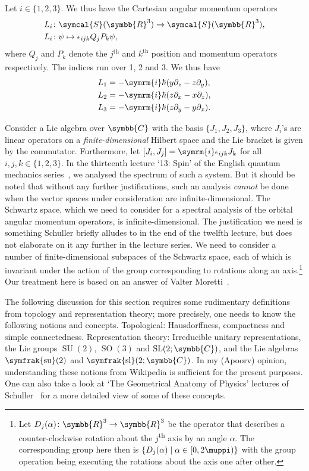 \documentclass[12pt, a4 paper]{article}
\theoremstyle{definition}
\newcommand{\position}{Q}
\newcommand{\momentum}{P}
\newcommand{\rthree}{\symbb{R}^3}
\newcommand{\rr}{\symbb{R}}
\newcommand{\cc}{\symbb{C}}
\newcommand{\schwartz}{\symcal{S}}
\newcommand{\schwartzrthree}{\schwartz(\rr^3)}
\renewcommand{\i}{\symrm{i}}
\renewcommand{\pi}{\muppi}
\newcommand{\levi}{\epsilon_{ijk}}
\newcommand{\sutwo}{\operatorname{\symfrak{su}}(2)}
\newcommand{\sltwoc}{\operatorname{\symfrak{sl}}(2;\cc)}
\newcommand{\SUtwo}{\operatorname{SU}(2)}
\newcommand{\SOthree}{\operatorname{SO}(3)}
\begin{document}
    Let $i \in \{1,2,3\}$. We thus have the Cartesian angular momentum operators
    \begin{align*}
        L_i &\colon \schwartzrthree \rightarrow \schwartzrthree,\\
        L_i &\colon \psi \mapsto \levi\position_j\momentum_k\psi,
    \end{align*}
    where $\position_j$ and $\momentum_k$ denote the $j^\text{th}$ and $k^\text{th}$ position and momentum operators respectively. The indices run over 1, 2 and 3.
    We thus have
    \begin{align*}
        L_1 &= -\i\hbar(y\partial_z - z\partial_y),\\
        L_2 &= -\i\hbar(z\partial_x - x\partial_z),\\
        L_3 &= -\i\hbar(z\partial_y - y\partial_x).
    \end{align*}

    Consider a Lie algebra over \(\cc\) with the basis \(\{J_1, J_2, J_3\}\), where \(J_i\)'s are linear operators on a \textit{finite-dimensional} Hilbert space and the Lie bracket is given by the commutator. Furthermore, let \([J_i, J_j] = \i \epsilon_{ijk} J_k\) for all \(i, j, k \in \{1, 2, 3\}\). In the thirteenth lecture `13: Spin' of the English quantum mechanics series~\cite{Schuller, SchullerVideos}, we analysed the spectrum of such a system. But it should be noted that without any further justifications, such an analysis \textit{cannot} be done when the vector spaces under consideration are infinite-dimensional. The Schwartz space, which we need to consider for a spectral analysis of the orbital angular momentum operators, is infinite-dimensional. The justification we need is something Schuller briefly alludes to in the end of the twelfth lecture, but does not elaborate on it any further in the lecture series. We need to consider a number of finite-dimensional subspaces of the Schwartz space, each of which is invariant under the action of the group corresponding to rotations along an axis.\footnote{Let \(D_j(\alpha) \colon \rthree \rightarrow \rthree\) be the operator that describes a counter-clockwise rotation about the \(j\)\textsuperscript{th} axis by an angle \(\alpha\). The corresponding group here then is \(\{D_j(\alpha) \mid \alpha \in [0, 2\pi)\}\) with the group operation being executing the rotations about the axis one after other.} Our treatment here is based on an answer of Valter Moretti~\cite{MorettiPeter}.

    The following discussion for this section requires some rudimentary definitions from topology and representation theory; more precisely, one needs to know the following notions and concepts. Topological: Hausdorffness, compactness and simple connectedness. Representation theory: Irreducible unitary representations, the Lie groups \(\SUtwo\), \(\SOthree\) and \(\operatorname{SL}(2;\cc)\), and the Lie algebras \(\sutwo\) and \(\sltwoc\). In my (Apoorv) opinion, understanding these notions from Wikipedia is sufficient for the present purposes. One can also take a look at `The Geometrical Anatomy of Physics' lectures of Schuller~\cite{Schuller_geometric_videos, Schuller_geometric_notes} for a more detailed view of some of these concepts.
\end{document}
